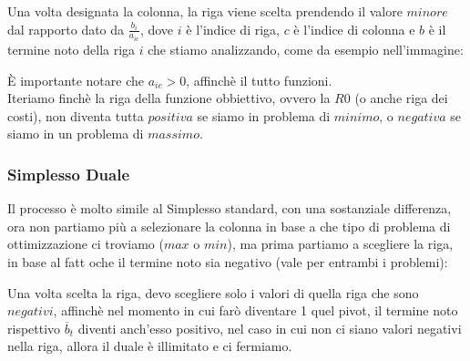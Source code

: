 \documentclass{article}
\begin{document}
Una volta designata la colonna, la riga viene scelta prendendo il valore $minore$ dal rapporto dato da $\frac{b_i}{a_{ic}}$, dove $i$ è l'indice di riga, $c$ è l'indice di colonna e $b$ è il termine noto della riga $i$ che stiamo analizzando, come da esempio nell'immagine:\\

\begin{center}
\end{center}

È importante notare che $a_{ic} > 0$, affinchè il tutto funzioni.\\
Iteriamo finchè la riga della funzione obbiettivo, ovvero la $R0$ (o anche riga dei costi), non diventa tutta $positiva$ se siamo in problema di $minimo$, o $negativa$ se siamo in un problema di $massimo$.

\subsubsection{Simplesso Duale}
Il processo è molto simile al Simplesso standard, con una sostanziale differenza, ora non partiamo più a selezionare la colonna in base a che tipo di problema di ottimizzazione ci troviamo ($max$ o $min$), ma prima partiamo a scegliere la riga, in base al fatt oche il termine noto sia negativo (vale per entrambi i problemi):\\
\begin{center}
\end{center}

Una volta scelta la riga, devo scegliere solo i valori di quella riga che sono $negativi$, affinchè nel momento in cui farò diventare 1 quel pivot, il termine noto rispettivo $\overline{b}_t$ diventi anch'esso positivo, nel caso in cui non ci siano valori negativi nella riga, allora il duale è illimitato e ci fermiamo.\\
\end{document}
